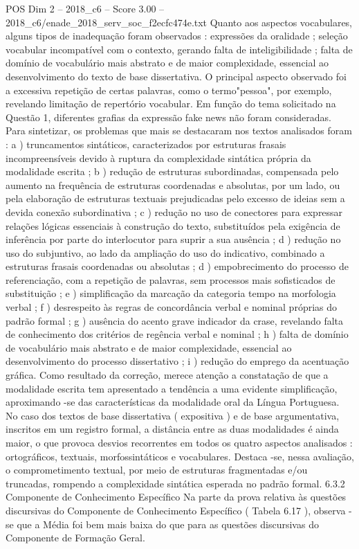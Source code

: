 \begin{textsample}{POS Dim 2 – 2018\_c6 – Score 3.00 – 2018\_c6/enade\_2018\_serv\_soc\_f2ecfc474e.txt}
Quanto aos aspectos vocabulares, alguns tipos de inadequação foram observados : expressões da oralidade ; seleção vocabular incompatível com o contexto, gerando falta de inteligibilidade ; falta de domínio de vocabulário mais abstrato e de maior complexidade, essencial ao desenvolvimento do texto de base dissertativa.
O principal aspecto observado foi a excessiva repetição de certas palavras, como o termo"pessoa", por exemplo, revelando limitação de repertório vocabular.
Em função do tema solicitado na Questão 1, diferentes grafias da expressão fake news não foram consideradas.
Para sintetizar, os problemas que mais se destacaram nos textos analisados foram : a ) truncamentos sintáticos, caracterizados por estruturas frasais incompreensíveis devido à ruptura da complexidade sintática própria da modalidade escrita ; b ) redução de estruturas subordinadas, compensada pelo aumento na frequência de estruturas coordenadas e absolutas, por um lado, ou pela elaboração de estruturas textuais prejudicadas pelo excesso de ideias sem a devida conexão subordinativa ; c ) redução no uso de conectores para expressar relações lógicas essenciais à construção do texto, substituídos pela exigência de inferência por parte do interlocutor para suprir a sua ausência ; d ) redução no uso do subjuntivo, ao lado da ampliação do uso do indicativo, combinado a estruturas frasais coordenadas ou absolutas ; d ) empobrecimento do processo de referenciação, com a repetição de palavras, sem processos mais sofisticados de substituição ; e ) simplificação da marcação da categoria tempo na morfologia verbal ; f ) desrespeito às regras de concordância verbal e nominal próprias do padrão formal ; g ) ausência do acento grave indicador da crase, revelando falta de conhecimento dos critérios de regência verbal e nominal ; h ) falta de domínio de vocabulário mais abstrato e de maior complexidade, essencial ao desenvolvimento do processo dissertativo ; i ) redução do emprego da acentuação gráfica.
Como resultado da correção, merece atenção a constatação de que a modalidade escrita tem apresentado a tendência a uma evidente simplificação, aproximando -se das características da modalidade oral da Língua Portuguesa.
No caso dos textos de base dissertativa ( expositiva ) e de base argumentativa, inscritos em um registro formal, a distância entre as duas modalidades é ainda maior, o que provoca desvios recorrentes em todos os quatro aspectos analisados : ortográficos, textuais, morfossintáticos e vocabulares.
Destaca -se, nessa avaliação, o comprometimento textual, por meio de estruturas fragmentadas e/ou truncadas, rompendo a complexidade sintática esperada no padrão formal. 6.3.2 Componente de Conhecimento Específico Na parte da prova relativa às questões discursivas do Componente de Conhecimento Específico ( Tabela 6.17 ), observa -se que a Média foi bem mais baixa do que para as questões discursivas do Componente de Formação Geral.

\end{textsample}

